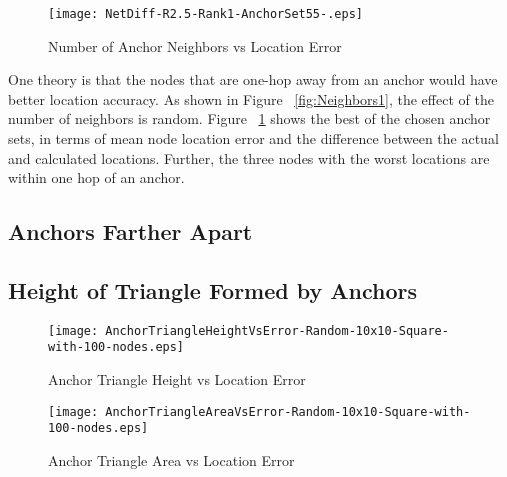 \begin{figure}
  \centering
    \texttt{[image: NetDiff-R2.5-Rank1-AnchorSet55-.eps]}
    \caption{Number of Anchor Neighbors vs Location Error}
    \label{fig:Neighbors1Network}
\end{figure}

One theory is that the nodes that are one-hop away from an anchor would have better location accuracy.  As shown in Figure ~\ref{fig:Neighbors1}, the effect of the number of neighbors is random.  Figure ~\ref{fig:Neighbors1Network} shows the best of the chosen anchor sets, in terms of mean node location error and the difference between the actual and calculated locations.  Further, the three nodes with the worst locations are within one hop of an anchor.


\subsection{Anchors Farther Apart}


\subsection{Height of Triangle Formed by Anchors}

\begin{figure}
  \centering
    \texttt{[image: AnchorTriangleHeightVsError-Random-10x10-Square-with-100-nodes.eps]}
    \caption{Anchor Triangle Height vs Location Error}
    \label{fig:Height1}
\end{figure}

\begin{figure}
  \centering
    \texttt{[image: AnchorTriangleAreaVsError-Random-10x10-Square-with-100-nodes.eps]}
    \caption{Anchor Triangle Area vs Location Error}
    \label{fig:Area}
\end{figure}
